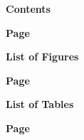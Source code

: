 \renewcommand{\thepage}{(\arabic{page})}
\setcounter{page}{3}         %

\begin{center}
  {\bfseries Contents \par}
\end{center}
\vspace{0.5em}
\noindent\hfill\textbf{Page}\par   %
\vspace{-0.5em}
\makeatletter{}\makeatother

\newpage
\begin{center}
  {\bfseries List of Figures \par}
\end{center}
\vspace{0.5em}
\noindent\hfill\textbf{Page}\par   %
\vspace{-0.5em}
\makeatletter{}\makeatother

\newpage
\begin{center}
  {\bfseries List of Tables \par}
\end{center}
\vspace{0.5em}
\noindent\hfill\textbf{Page}\par   %
\vspace{-0.5em}
\makeatletter{}\makeatother

\newpage
{}       %